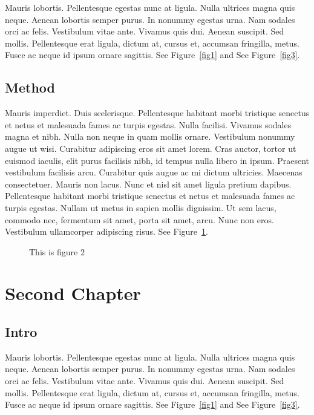 \documentclass{report}
\begin{document}
Mauris lobortis. Pellentesque egestas nunc at ligula. Nulla ultrices magna quis
neque. Aenean lobortis semper purus. In nonummy egestas urna. Nam sodales orci
ac felis. Vestibulum vitae ante. Vivamus quis dui. Aenean suscipit. Sed mollis.
Pellentesque erat ligula, dictum at, cursus et, accumsan fringilla, metus. Fusce
ac neque id ipsum ornare sagittis.  See Figure~\ref{fig1} and See Figure~\ref{fig3}.

\section{Method}
Mauris imperdiet. Duis scelerisque. Pellentesque habitant morbi tristique
senectus et netus et malesuada fames ac turpis egestas. Nulla facilisi. Vivamus
sodales magna et nibh. Nulla non neque in quam mollis ornare. Vestibulum nonummy
augue ut wisi. Curabitur adipiscing eros sit amet lorem. Cras auctor, tortor ut
euismod iaculis, elit purus facilisis nibh, id tempus nulla libero in ipsum.
Praesent vestibulum facilisis arcu. Curabitur quis augue ac mi dictum ultricies.
Maecenas consectetuer. Mauris non lacus. Nunc et nisl sit amet ligula pretium
dapibus. Pellentesque habitant morbi tristique senectus et netus et malesuada
fames ac turpis egestas. Nullam ut metus in sapien mollis dignissim. Ut sem
lacus, commodo nec, fermentum sit amet, porta sit amet, arcu. Nunc non eros.
Vestibulum ullamcorper adipiscing risus.  See Figure~\ref{fig2}.

\begin{figure}[h]
\begin{center}
\vspace{2cm}
\label{fig2}
\caption{This is figure 2}
\end{center}
\end{figure}

\chapter{Second Chapter}

\section{Intro}
Mauris lobortis. Pellentesque egestas nunc at ligula. Nulla ultrices magna quis
neque. Aenean lobortis semper purus. In nonummy egestas urna. Nam sodales orci
ac felis. Vestibulum vitae ante. Vivamus quis dui. Aenean suscipit. Sed mollis.
Pellentesque erat ligula, dictum at, cursus et, accumsan fringilla, metus. Fusce
ac neque id ipsum ornare sagittis.  See Figure~\ref{fig1} and See Figure~\ref{fig3}.
\end{document}
